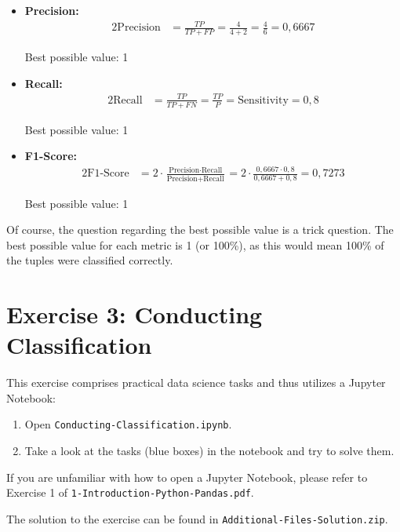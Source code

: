 \documentclass[
english,
smallborders
]{i6prcsht}
\begin{document}
\begin{solution}
\begin{itemize}
		      Best possible value: 1
		\item \textbf{Precision:}
		      \begin{alignat*}{2}
			      \text{Precision} & = \frac{TP}{TP + FP} = \frac{4}{4 + 2} = \frac{4}{6} = 0,6667
		      \end{alignat*}
		      
		      Best possible value: 1
		\item \textbf{Recall:}
		      \begin{alignat*}{2}
			      \text{Recall} & = \frac{TP}{TP + FN} = \frac{TP}{P} = \text{Sensitivity} = 0,8
		      \end{alignat*}
		      
		      Best possible value: 1
		\item \textbf{F1-Score:}
		      \begin{alignat*}{2}
			      \text{F1-Score} & = 2 \cdot \frac{\text{Precision} \cdot \text{Recall}}{\text{Precision} + \text{Recall}} = 2 \cdot \frac{0,6667 \cdot 0,8}{0,6667 + 0,8} = 0,7273
		      \end{alignat*}
		      
		      Best possible value: 1
	\end{itemize}
	
	Of course, the question regarding the best possible value is a trick question. The best possible value for each metric is 1 (or 100\%), as this would mean 100\% of the tuples were classified correctly.
	
	
\end{solution}

\newpage

\section*{Exercise 3: Conducting Classification}

This exercise comprises practical data science tasks and thus utilizes a Jupyter Notebook:

\begin{enumerate}	
	\item Open \texttt{Conducting-Classification.ipynb}.
	\item Take a look at the tasks (blue boxes) in the notebook and try to solve them.
\end{enumerate}

If you are unfamiliar with how to open a Jupyter Notebook, please refer to Exercise 1 of \texttt{1-Introduction-Python-Pandas.pdf}.

\begin{solution}	
	The solution to the exercise can be found in \texttt{Additional-Files-Solution.zip}.
\end{solution}
\end{document}
